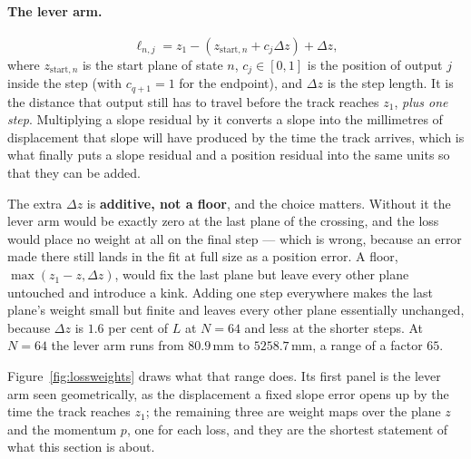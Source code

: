 \documentclass[11pt,a4paper]{article}
\newcommand{\mm}{\ensuremath{\,\mathrm{mm}}}
\begin{document}
\paragraph{The lever arm.}
%
\begin{equation}
  \ell_{n,j} = z_1 - \left(z_{\mathrm{start},n} + c_j \Delta z\right)
               + \Delta z,
  \label{eq:lever}
\end{equation}
%
where $z_{\mathrm{start},n}$ is the start plane of state $n$, $c_j \in [0,1]$
is the position of output $j$ inside the step (with $c_{q+1} = 1$ for the
endpoint), and $\Delta z$ is the step length. It is the distance that output
still has to travel before the track reaches $z_1$, \emph{plus one step}.
Multiplying a slope residual by it converts a slope into the millimetres of
displacement that slope will have produced by the time the track arrives, which
is what finally puts a slope residual and a position residual into the same
units so that they can be added.

The extra $\Delta z$ is \textbf{additive, not a floor}, and the choice matters.
Without it the lever arm would be exactly zero at the last plane of the
crossing, and the loss would place no weight at all on the final step --- which
is wrong, because an error made there still lands in the fit at full size as a
position error. A floor, $\max(z_1 - z, \Delta z)$, would fix the last plane
but leave every other plane untouched and introduce a kink. Adding one step
everywhere makes the last plane's weight small but finite and leaves every
other plane essentially unchanged, because $\Delta z$ is $1.6$ per cent of $L$
at $N = 64$ and less at the shorter steps. At $N = 64$ the lever arm runs from
$80.9\mm$ to $5258.7\mm$, a range of a factor $65$.

Figure~\ref{fig:lossweights} draws what that range does. Its first panel is the
lever arm seen geometrically, as the displacement a fixed slope error opens up
by the time the track reaches $z_1$; the remaining three are weight maps over
the plane $z$ and the momentum $p$, one for each loss, and they are the shortest
statement of what this section is about.
\end{document}
